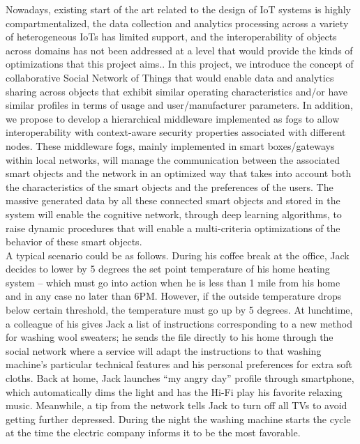 Nowadays, existing start of the art related to the design of IoT systems is highly compartmentalized, the data collection and analytics processing across a variety of heterogeneous IoTs has limited support, and the interoperability of objects across domains has not been addressed at a level that would provide the kinds of optimizations that this project aims.. In this project, we introduce the concept of collaborative Social Network of Things that would enable data and analytics sharing across objects that exhibit similar operating characteristics and/or have similar profiles in terms of usage and user/manufacturer parameters. In addition, we propose to develop a hierarchical middleware implemented as fogs to allow interoperability with context-aware security properties associated with different nodes. These middleware fogs, mainly implemented in smart boxes/gateways within local networks, will manage the communication between the associated smart objects and the network in an optimized way that takes into account both the characteristics of the smart objects and the preferences of the users. The massive generated data by all these connected smart objects and stored in the system will enable the cognitive network, through deep learning algorithms, to raise dynamic procedures that will enable a multi-criteria optimizations of the  behavior  of these smart objects.\\

A typical scenario could be as follows. During his  coffee break at the office, Jack decides to lower by 5 degrees the set point temperature of his home heating system – which must go into action when he is less than 1 mile from his home and in any case no later than 6PM. However, if the outside temperature drops below certain threshold, the temperature must go up by 5 degrees. At lunchtime, a colleague of his gives Jack a list of instructions corresponding to a new method for washing wool sweaters; he  sends the file directly to his home through the social network where a service will adapt the instructions to that washing machine’s particular technical features and his personal preferences for extra soft cloths. Back at home, Jack launches “my angry day” profile through  smartphone, which automatically dims the light and has the Hi-Fi play his favorite relaxing music. Meanwhile, a tip from the network tells Jack to turn off all TVs to avoid getting further depressed. During the night the washing machine starts the cycle at the time the electric company informs it to be the most favorable.\\

